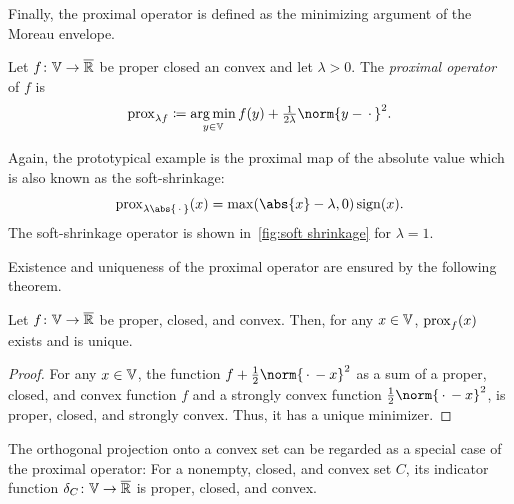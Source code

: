 Finally, the proximal operator is defined as the minimizing argument of the Moreau envelope.
\begin{definition}%
	\label{def:proximal operator}
	Let \( f \colon \mathbb{V} \to \overline{\mathbb{R}} \) be proper closed an convex and let \( \lambda > \num{0} \).
	The \emph{proximal operator} of \( f \) is
	\[
		\prox_{\lambda f} \coloneqq \argmin_{y \in \V} f(y) + \tfrac{1}{2\lambda} \norm{y - \argm}^{\num{2}}.
	\]
\end{definition}
Again, the prototypical example is the proximal map of the absolute value which is also known as the soft-shrinkage:
\begin{equation}
	\prox_{\lambda \abs{\argm}}(x) = \max(\abs{x} - \lambda, 0)\sign(x).
\end{equation}
The soft-shrinkage operator is shown in~\cref{fig:soft shrinkage} for \( \lambda = 1 \).
\begin{sidefigure}
	\caption[%
		The proximal operator of the absolute value%
	]{%
		The proximal operator of the absolute value is the well-known soft shrinkage.%
	}%
	\label{fig:soft shrinkage}
\end{sidefigure}
Existence and uniqueness of the proximal operator are ensured by the following theorem.
\begin{theorem}
	Let \( f \colon \mathbb{V} \to \overline{\mathbb{R}} \) be proper, closed, and convex.
	Then, for any \( x \in \mathbb{V} \), \( \operatorname{prox}_{f} (x) \) exists and is unique.
\end{theorem}
\begin{proof}
	For any \( x \in \mathbb{V} \), the function \( f + \frac{1}{2}\norm{\argm - x}^{\num{2}} \) as a sum of a proper, closed, and convex function \( f \) and a strongly convex function \( \frac{1}{2}\norm{\argm - x}^{\num{2}} \), is proper, closed, and strongly convex.
	Thus, it has a unique minimizer.
\end{proof}
The orthogonal projection onto a convex set can be regarded as a special case of the proximal operator:
For a nonempty, closed, and convex set \( C \), its indicator function \( \delta_{C} \colon \mathbb{V} \to \overline{\mathbb{R}} \) is proper, closed, and convex.
